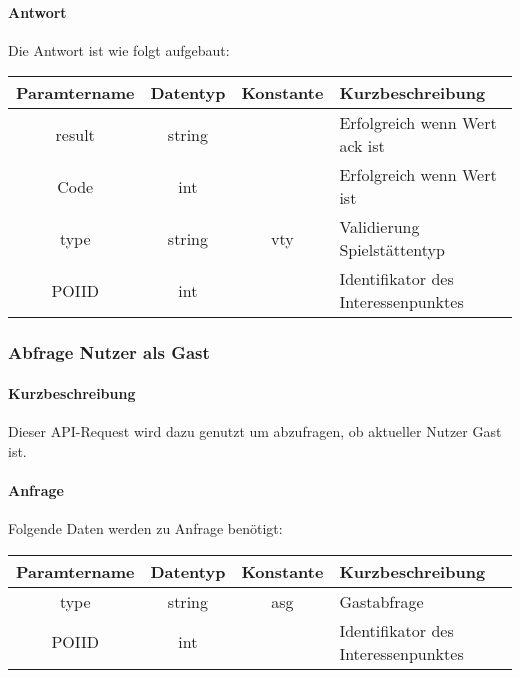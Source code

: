 \paragraph{Antwort}Die Antwort ist wie folgt aufgebaut:
\begin{table}[H]
	\begin{tabular}{|c|c|c|p{6.5cm}|}
		\hline
		\textbf{Paramtername} & \textbf{Datentyp} & \textbf{Konstante} & \textbf{Kurzbeschreibung}                                                                                               \\ \hline
		result              & string           &                 & Erfolgreich wenn Wert {\glqq ack\grqq} ist \\ \hline
		Code                & int              &                 & Erfolgreich wenn Wert {\glqq 0\grqq} ist \\ \hline
		type                & string           & vty             & Validierung Spielstättentyp \\ \hline
		POIID               & int              &                 & Identifikator des Interessenpunktes \\ \hline
	\end{tabular}
\end{table}
\subsubsection{Abfrage Nutzer als Gast}
\paragraph{Kurzbeschreibung}Dieser API-Request wird dazu genutzt um abzufragen, ob aktueller Nutzer Gast ist.
\paragraph{Anfrage}Folgende Daten werden zu Anfrage benötigt:
\begin{table}[H]
	\begin{tabular}{|c|c|c|p{6.5cm}|}
		\hline
		\textbf{Paramtername} & \textbf{Datentyp} & \textbf{Konstante} & \textbf{Kurzbeschreibung}                                                                                               \\ \hline
		type                & string            & asg                & Gastabfrage \\ \hline
		POIID               & int               &                    & Identifikator des Interessenpunktes \\ \hline
	\end{tabular}
\end{table}
